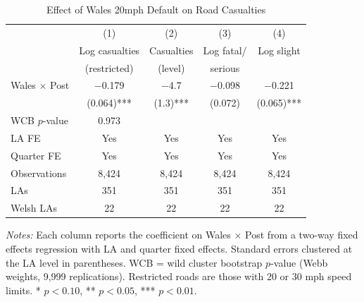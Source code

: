 \begin{table}[H]
\centering
\caption{Effect of Wales 20mph Default on Road Casualties}
\label{tab:main}
\begin{threeparttable}
\begin{tabular}{lcccc}
\toprule
& (1) & (2) & (3) & (4) \\
& Log casualties & Casualties & Log fatal/ & Log slight \\
& (restricted) & (level) & serious & \\
\midrule
Wales $\times$ Post & $-$0.179 & $-$4.7 & $-$0.098 & $-$0.221 \\
& (0.064)*** & (1.3)*** & (0.072) & (0.065)*** \\
WCB $p$-value & 0.973 & & & \\
\midrule
LA FE & Yes & Yes & Yes & Yes \\
Quarter FE & Yes & Yes & Yes & Yes \\
Observations & 8,424 & 8,424 & 8,424 & 8,424 \\
LAs & 351 & 351 & 351 & 351 \\
Welsh LAs & 22 & 22 & 22 & 22 \\
\bottomrule
\end{tabular}
\begin{tablenotes}[flushleft]
\small
\item \textit{Notes:} Each column reports the coefficient on Wales $\times$ Post from a two-way fixed effects regression with LA and quarter fixed effects. Standard errors clustered at the LA level in parentheses. WCB = wild cluster bootstrap $p$-value (Webb weights, 9,999 replications). Restricted roads are those with 20 or 30 mph speed limits. * $p<0.10$, ** $p<0.05$, *** $p<0.01$.
\end{tablenotes}
\end{threeparttable}
\end{table}

